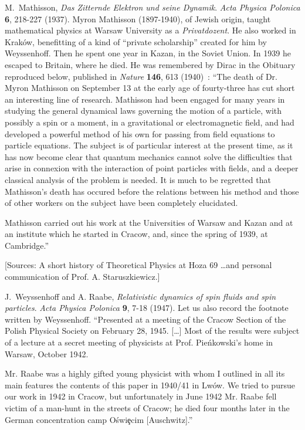 \documentclass[a4paper,11pt]{article}
\begin{document}
\begin{thebibliography}{99}
M.~Mathisson,
{\it Das Zitternde Elektron und seine Dynamik}.
{\sl Acta Physica Polonica} {\bf 6}, 218-227 (1937).
Myron Mathisson (1897-1940), of Jewish origin,
taught mathematical physics at Warsaw University
as a {\it Privatdozent}. He also worked in Krak\'ow,
benefitting of a kind of ``private scholarship''
created for him by Weyssenhoff.
Then he spent one year in Kazan, in the Soviet Union.
In 1939 he escaped to Britain, where he died.
He was remembered by
Dirac in the Obituary reproduced below, published
in  {\sl Nature} {\bf 146}, 613 (1940)~:
``The death of Dr. Myron Mathisson on September 13 at the early
age of fourty-three has cut short an interesting line of research.
Mathisson had been engaged for many years in studying the general
dynamical laws governing the motion of a particle,
with possibly a spin or a moment, in a gravitational or
electromagnetic field, and had developed a powerful method of his own
for passing from field equations to particle equations. The subject
is of particular interest at the present time, as it has now become
clear that quantum mechanics cannot solve the difficulties that arise
in connexion with the interaction of point particles with fields,
and a deeper classical analysis of the problem is needed.
It is much to be regretted that Mathisson's death has occured
before the relations between his method and those of other workers
on the subject have been completely elucidated.

Mathisson carried out his work at the Universities of Warsaw and Kazan
and at an institute which he started in Cracow, and, since the spring
of 1939, at Cambridge.''

[Sources: A short history of Theoretical Physics at Hoza 69 \dots and 
personal communication of
Prof. A. Staruszkiewicz.]

J.~Weyssenhoff and A. Raabe,
{\it Relativistic dynamics of spin fluids and spin particles}.
{\sl Acta Physica Polonica} {\bf 9}, 7-18
(1947). Let us also record the footnote written
by Weyssenhoff. ``Presented at a meeting of the
Cracow Section of the Polish Physical Society on February 28, 1945.
[\dots] Most of the results were subject of a lecture at a
secret meeting of physicists at Prof. Pie\'nkowski's home
in Warsaw, October 1942.

Mr. Raabe was a highly gifted young physicist with whom I outlined in
all its main features the contents of this paper in 1940/41 in Lw\'ow.
We tried to pursue our work in 1942 in Cracow, but unfortunately
in June 1942 Mr. Raabe fell victim of a man-hunt in the streets of
Cracow; he died four months later in the German concentration camp
O\'swi\c ecim [Auschwitz].''


\end{thebibliography}
\end{document}
